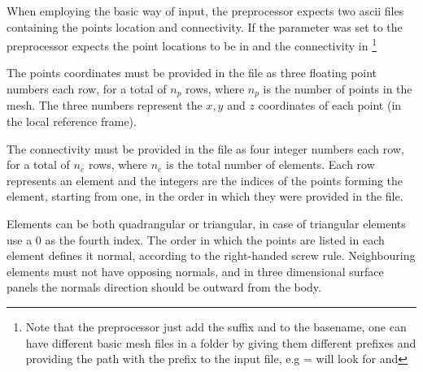 When employing the basic way of input, the preprocessor expects two ascii files containing the points location and connectivity. If the parameter  was set to  the preprocessor expects the point locations to be in  and the connectivity in  \footnote{Note that the preprocessor just add the suffix  and  to the basename, one can have different basic mesh files in a folder by giving them different prefixes and providing the path with the prefix to the input file, e.g  =  will look for  and }

The points coordinates must be provided in the  file as three floating point numbers each row, for a total of $n_p$ rows, where $n_p$ is the number of points in the mesh. The three numbers represent the $x, y$ and $z$ coordinates of each point (in the local reference frame).

The connectivity must be provided in the  file as four integer numbers each row, for a total of $n_e$ rows, where $n_e$ is the total number of elements. Each row represents an element and the integers are the indices of the points forming the element, starting from one, in the order in which they were provided in the  file.

Elements can be both quadrangular or triangular, in case of triangular elements use a 0 as the fourth index. The order in which the points are listed in each element defines it normal, according to the right-handed screw rule. Neighbouring elements must not have opposing normals, and in three dimensional surface panels the normals direction should be outward from the body. 

